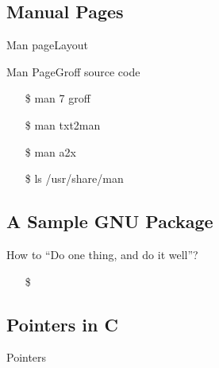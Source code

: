 \subsection{Manual Pages}
\label{sec:manual-pages}

\begin{frame}{Man page}{Layout}
  \centering
  \mode<beamer>{ \texttt{[image: manpage-txt]} }%
\end{frame}

\begin{frame}{Man Page}{Groff source code}
  \begin{minipage}[b]{.7\linewidth}
    \centering
  \end{minipage}\hfill
  \begin{minipage}[b]{.3\linewidth}\ttfamily\small
    \begin{itemize}
    \item[\$] man 7 groff
    \item[\$] man txt2man
    \item[\$] man a2x
    \item[\$] ls /usr/share/man
    \end{itemize}
  \end{minipage}
\end{frame}

\subsection{A Sample GNU Package}
\label{sec:sample-gnu-package}

\begin{frame}{How to ``Do one thing, and do it well''?}  
  \begin{itemize}
  \item[\$] 
  \end{itemize}
\end{frame}

\subsection{Pointers in C}
\label{sec:pointers-c}

\begin{frame}{Pointers}
\end{frame}

